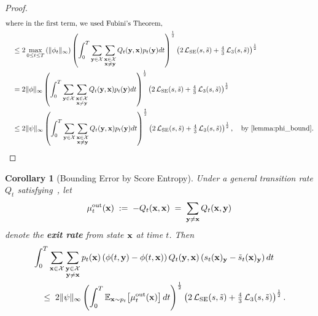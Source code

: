 \documentclass{article} %
\newtheorem{corollary}[theorem]{Corollary}
\newcommand{\bfx}{{\bf x}}
\newcommand{\bfy}{ {\bf y}}
\newcommand{\LSE}{\mathcal{L}_{\mathrm{SE}}}
\newcommand{\LThree}{\mathcal{L}_{3}}
\begin{document}
\begin{proof}
\begin{align*}
    \intertext{where in the first term, we used Fubini's Theorem,}
    \quad & \leq 2 \max_{0\leq t\leq T}\left(\| \phi_t\|_\infty \right)  \left( \int_0^T \sum_{\substack{\bfy \in\mathcal{X}}} \sum_{\substack{\bfx \in\mathcal{X} \\ \bfx \neq \bfy}}  Q_t(\bfy, \bfx) p_t(\bfy)    dt \right)^{\frac{1}{2}} \left( 2\,\LSE(s, \tilde{s}) + \tfrac{4}{3}\,\LThree(s, \tilde{s}) \right)^{\frac{1}{2}} \\
    \quad & = 2 \| \phi\|_\infty  \left( \int_0^T \sum_{\substack{\bfy \in\mathcal{X}}} \sum_{\substack{\bfx \in\mathcal{X} \\ \bfx \neq \bfy}}  Q_t(\bfy, \bfx) p_t(\bfy)    dt \right)^{\frac{1}{2}} \left( 2\,\LSE(s, \tilde{s}) + \tfrac{4}{3}\,\LThree(s, \tilde{s}) \right)^{\frac{1}{2}} \\
    \quad &\leq 2 \| \psi\|_\infty  \left( \int_0^T \sum_{\substack{\bfy \in\mathcal{X}}} \sum_{\substack{\bfx \in\mathcal{X} \\ \bfx \neq \bfy}}  Q_t(\bfy, \bfx) p_t(\bfy)    dt \right)^{\frac{1}{2}} \left( 2\,\LSE(s, \tilde{s}) + \tfrac{4}{3}\,\LThree(s, \tilde{s}) \right)^{\frac{1}{2}}, \quad \text{by~\Cref{lemma:phi_bound}.}
\end{align*}
\end{proof}

\begin{corollary}[Bounding Error by Score Entropy]\label{cor:error_bound_LSE}
Under a general transition rate $Q_t$ satisfying~, let
\[
  \mu^\mathrm{out}_t(\bfx) \;:=\; -Q_t(\bfx, \bfx) 
   \;=\; \sum_{\bfy \neq \bfx} Q_t(\bfx, \bfy)
\]
denote the \textbf{exit rate} from state $\bfx$ at time $t$. Then
\begin{align*}
  & \int_0^T \sum_{\bfx\in\mathcal{X}} \sum_{\substack{\bfy\in\mathcal{X} \\ \bfy\neq \bfx}} 
    p_t(\bfx) \left(\phi(t, \bfy)-\phi(t, \bfx) \right) Q_t(\bfy, \bfx) 
    \left( s_t(\bfx)_\bfy - \tilde{s}_t(\bfx)_\bfy \right) dt \\
  &\quad\leq\; 2 \| \psi\|_\infty 
    \left( \int_0^T \mathbb{E}_{\bfx \sim p_t}\!\left[ \mu^\mathrm{out}_t(\bfx) \right] dt \right)^{\frac{1}{2}}
    \left( 2\,\LSE(s, \tilde{s}) + \tfrac{4}{3}\,\LThree(s, \tilde{s}) \right)^{\frac{1}{2}}.
\end{align*}
\end{corollary}
\end{document}
